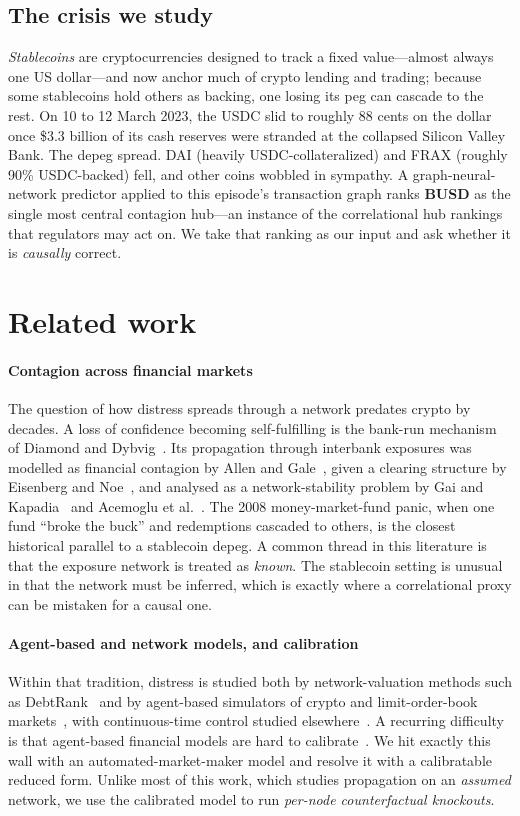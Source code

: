 \documentclass[sigconf,anonymous]{acmart}
\begin{document}
\subsection{The crisis we study}
\emph{Stablecoins} are cryptocurrencies designed to track a fixed value---almost always one
US dollar---and now anchor much of crypto lending and trading; because some stablecoins hold
others as backing, one losing its peg can cascade to the rest. On 10 to 12 March 2023, the
USDC slid to roughly 88 cents on the dollar once \$3.3 billion of its cash
reserves were stranded at the collapsed Silicon Valley Bank. The depeg spread. DAI (heavily USDC-collateralized) and FRAX (roughly
90\% USDC-backed) fell, and other coins wobbled in sympathy. A graph-neural-network predictor applied to this episode's transaction graph ranks \textbf{BUSD}
as the single most central contagion hub---an instance of the correlational hub rankings that
regulators may act on. We take that ranking as our input and ask whether it is \emph{causally} correct.

\section{Related work}
\paragraph{Contagion across financial markets} The question of how distress spreads through a network
predates crypto by decades. A loss of confidence becoming self-fulfilling is the bank-run mechanism of
Diamond and Dybvig~\cite{diamond1983bank}. Its propagation through interbank exposures was modelled as
financial contagion by Allen and Gale~\cite{allen2000financial}, given a clearing structure by Eisenberg
and Noe~\cite{eisenberg2001systemic}, and analysed as a network-stability problem by Gai and
Kapadia~\cite{gai2010contagion} and Acemoglu et al.~\cite{acemoglu2015systemic}. The 2008 money-market-fund
panic, when one fund ``broke the buck'' and redemptions cascaded to others, is the closest historical
parallel to a stablecoin depeg. A common thread in this literature is that the exposure network is
treated as \emph{known}. The stablecoin setting is unusual in that the network must be inferred, which is
exactly where a correlational proxy can be mistaken for a causal one.

\paragraph{Agent-based and network models, and calibration} Within that tradition, distress is studied
both by network-valuation methods such as DebtRank~\cite{battiston2012debtrank} and by agent-based
simulators of crypto and limit-order-book markets~\cite{gu2024spoofability}, with continuous-time control
studied elsewhere~\cite{huang2025ctrl}. A recurring difficulty is that agent-based financial models are
hard to calibrate~\cite{mohl2025jaxmarl}. We hit exactly this wall with an automated-market-maker model
and resolve it with a calibratable reduced form. Unlike most of this work, which studies propagation on
an \emph{assumed} network, we use the calibrated model to run \emph{per-node counterfactual knockouts}.
\end{document}
